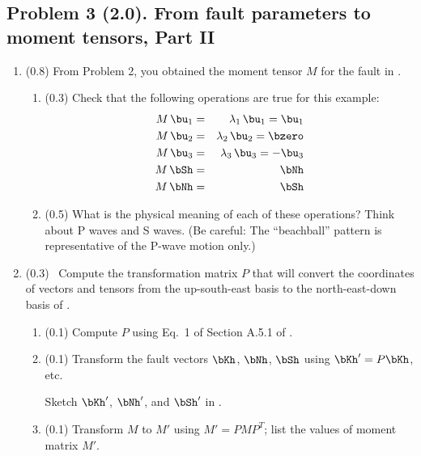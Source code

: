 \documentclass[11pt,titlepage,fleqn]{article}
\newcommand{\Mmat}{M}
\newcommand{\Pmat}{P}
\begin{document}

\pagebreak
\subsection*{Problem 3 (2.0). From fault parameters to moment tensors, Part II}

\begin{enumerate}

\item (0.8) From Problem 2, you obtained the moment tensor $\Mmat$ for the fault in .

\begin{enumerate}
\item (0.3) Check that the following operations are true for this example:
%
\begin{eqnarray}
\Mmat \, \bu_1 &=& \lambda_1 \, \bu_1 = \bu_1
\\
\Mmat \, \bu_2 &=& \lambda_2 \, \bu_2 = \bzero
\\
\Mmat \, \bu_3 &=& \lambda_3 \, \bu_3 = -\bu_3
\\
\Mmat \, \bSh &=& \bNh
\\
\Mmat \, \bNh &=& \bSh
\end{eqnarray}

\item (0.5) What is the physical meaning of each of these operations? Think about P waves and S waves. (Be careful: The ``beachball'' pattern is representative of the P-wave motion only.)

\end{enumerate}


\item (0.3) \ptag\ Compute the transformation matrix $\Pmat$ that will convert the coordinates of vectors and tensors from the up-south-east basis to the north-east-down basis of \citet{AkiRichardsE2}.
%
\begin{enumerate}
\item (0.1) Compute $\Pmat$ using Eq.~1 of Section A.5.1 of \cite{SteinWysession}.

\item (0.1) Transform the fault vectors $\bKh$, $\bNh$, $\bSh$ using $\bKh' = \Pmat\bKh$, etc.

Sketch $\bKh'$, $\bNh'$, and $\bSh'$ in .

\item (0.1) Transform $\Mmat$ to $\Mmat'$ using $\Mmat' = \Pmat \Mmat \Pmat^T$; list the values of moment matrix $M'$.
\end{enumerate}


\end{enumerate}
\end{document}

